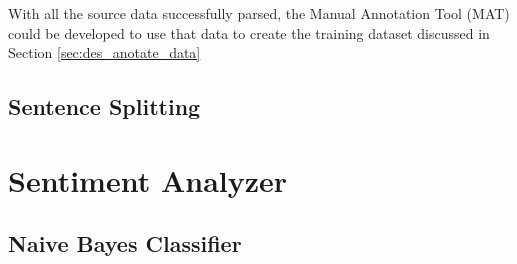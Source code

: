 With all the source data successfully parsed, the Manual Annotation Tool (MAT) could be developed to use that data to create the training dataset discussed in Section \ref{sec:des_anotate_data}

\subsection{Sentence Splitting}
\label{sec:imp_sentence_split}
\section{Sentiment Analyzer}
\label{sec:imp_sentiment_analyzer}
\subsection{Naive Bayes Classifier}
\label{sec:imp_naive_bayes}

